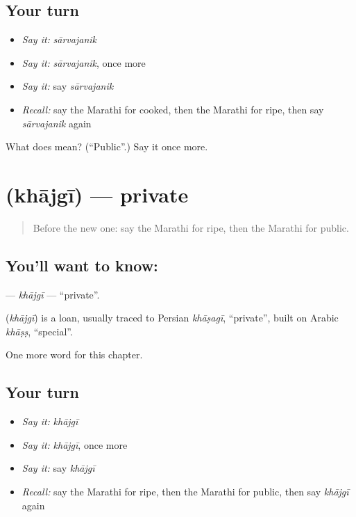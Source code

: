\subsection*{Your turn}
\begin{itemize}
\raggedright
  \item \emph{Say it:} \emph{sārvajanik}
  \item \emph{Say it:} \emph{sārvajanik}, once more
  \item \emph{Say it:} say \emph{sārvajanik}
  \item \emph{Recall:} say the Marathi for cooked, then the Marathi for ripe, then say \emph{sārvajanik} again
\end{itemize}

\begin{tcolorbox}[breakable,colback=teal!4,colframe=teal!35!black,title={Before you move on}]
What does  mean? (\textquotedblleft{}Public\textquotedblright{}.) Say it once more.
\end{tcolorbox}
\section[\texorpdfstring{\mr{खाजगी} (khājgī)}{खाजगी (khājgī)}]{ (khājgī) — private}

\label{lesson:MR-C206-khajgi}



\begin{quote}
Before the new one: say the Marathi for ripe, then the Marathi for public.
\end{quote}

\subsection*{You'll want to know: }
\textbf{} — \emph{khājgī} — \textquotedblleft{}private\textquotedblright{}.

\begin{cousinweb}
\textbf{} (\emph{khājgī}) is a loan, usually traced to Persian \emph{khāṣagī}, \textquotedblleft{}private\textquotedblright{}, built on Arabic \emph{khāṣṣ}, \textquotedblleft{}special\textquotedblright{}.
\end{cousinweb}

\begin{grammarlens}[title={What you've built}]
One more word for this chapter.
\end{grammarlens}

\subsection*{Your turn}
\begin{itemize}
\raggedright
  \item \emph{Say it:} \emph{khājgī}
  \item \emph{Say it:} \emph{khājgī}, once more
  \item \emph{Say it:} say \emph{khājgī}
  \item \emph{Recall:} say the Marathi for ripe, then the Marathi for public, then say \emph{khājgī} again
\end{itemize}

